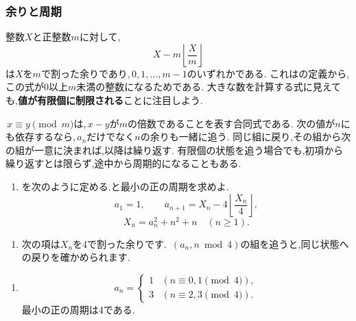   \subsubsection{余りと周期}\label{節：ガウス型の余りと周期}
    整数$X$と正整数$m$に対して,
    \[
      X-m\left\lfloor\frac Xm\right\rfloor
    \]
    は$X$を$m$で割った余りであり,\,$0,1,\ldots,m-1$のいずれかである.
    これはの定義から,この式が0以上$m$未満の整数になるためである.
    大きな数を計算する式に見えても,\textbf{値が有限個に制限される}ことに注目しよう.

    \,$x\equiv y\pmod m$は,\,$x-y$が$m$の倍数であることを表す合同式である.
    次の値が$n$にも依存するなら,\,$a_n$だけでなく$n$の余りも一緒に追う.
    同じ組に戻り,その組から次の組が一意に決まれば,以降は繰り返す.
    有限個の状態を追う場合でも,初項から繰り返すとは限らず,途中から周期的になることもある.

    \noindent {}\par\nobreak
    \begin{enumerate}[label=(\arabic*),parsep=3pt,beginpenalty=10000,format=\bookitemlink{example-gauss-role-3}{problem}{answer}]
      \item {}を次のように定める.と最小の正の周期を求めよ.
            \[
              a_1=1,\qquad
              a_{n+1}=X_n-4\left\lfloor\frac{X_n}{4}\right\rfloor,
            \]
            \[
              X_n=a_n^2+n^2+n\quad(n\ge1).
            \]
    \end{enumerate}

    \noindent {}\par\nobreak
    \begin{enumerate}[label=(\arabic*),parsep=3pt,beginpenalty=10000,format=\bookitemlink{example-gauss-role-3}{hint}{problem}]
      \item 次の項は$X_n$を4で割った余りです.
            \,$(a_n,n\bmod4)$の組を追うと,同じ状態への戻りを確かめられます.
    \end{enumerate}

    \noindent {}\par\nobreak
    \begin{enumerate}[label=(\arabic*),parsep=3pt,beginpenalty=10000,format=\bookitemlink{example-gauss-role-3}{answer}{problem}]
      \item \[
              a_n=
              \begin{cases}
                1 & (n\equiv0,1\pmod4),\\
                3 & (n\equiv2,3\pmod4).
              \end{cases}
            \]
            最小の正の周期は4である.
    \end{enumerate}

